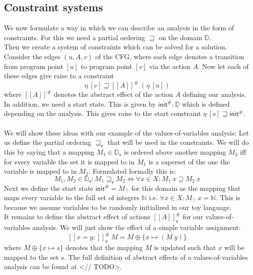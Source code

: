     \subsection{Constraint systems}
    We now formulate a way in which we can describe an analysis in the form of constraints. For this we need a partial ordering $\sqsupseteq$ on the domain $\mathbb{D}$.\\
    Then we create a system of constraints which can be solved for a solution. Consider the edges $(u, A, v)$ of the \ac{CFG}, where each edge denotes a transition from program point $[u]$ to program point $[v]$ via the action $A$. Now let each of these edges give raise to a constraint
    \[\eta\ [v] \sqsupseteq [\![A]\!]^{\#}\ (\eta\ [u])\]
    where $[\![A]\!]^{\#}$ denotes the abstract effect of the action $A$ defining our analysis. In addition, we need a start state. This is given by $\textsf{init}^{\#}: \mathbb{D}$ which is defined depending on the analysis. This gives raise to the start constraint $\eta\ [s] \sqsupseteq \textsf{init}^{\#}$.\\
    \\
    We will show these ideas with our example of the values-of-variables analysis: Let us define the partial ordering $\sqsupseteq_\textsf{v}$ that will be used in the constraints. We will do this by saying that a mapping $M_1 \in \mathbb{D}_\textsf{v}$ is ordered above another mapping $M_2$ iff for every variable the set it is mapped to in $M_1$ is a superset of the one the variable is mapped to in $M_2$. Formulated formally this is:
    \[M_1, M_2 \in \mathbb{D}_\textsf{v}: M_1 \sqsupseteq_\textsf{v} M_2 \Longleftrightarrow \forall x \in X: M_1\ x \supseteq M_2\ x\]
    Next we define the start state $\textsf{init}^{\#} = M_\top$ for this domain as the mapping that maps every variable to the full set of integers $\mathbb{N}$ i.e. $\forall x \in X: M_\top\ x = \mathbb{N}$. This is because we assume variables to be randomly initialized in our toy language.\\
    It remains to define the abstract effect of actions $[\![A]\!]^{\#}_\textsf{v}$ for our values-of-variables analysis. We will just show the effect of a simple variable assignment:
    \[ [\![ x=y; ]\!]^{\#}_\textsf{v}\ M = M \oplus \{x \mapsto (M\ y) \} \]
    where $M \oplus \{x \mapsto s\}$ denotes that the mapping $M$ is updated such that $x$ will be mapped to the set $s$. The full definition of abstract effects of a values-of-variables analysis can be found at <// TODO>.\\


